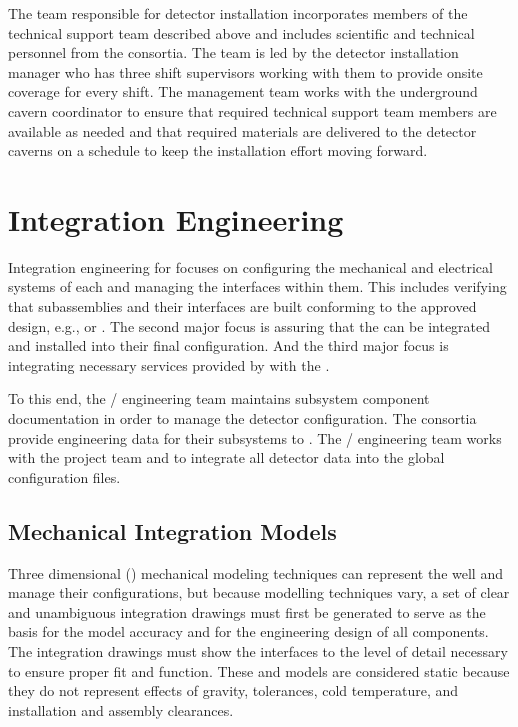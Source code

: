 The team responsible for detector installation incorporates 
members of the technical support team described above 
and includes scientific and technical personnel from 
the  consortia.  The team is led by the detector
installation manager who has three shift supervisors working 
with them to provide onsite coverage for every shift.
The management team works with the underground cavern
coordinator to ensure that required technical support team 
members are available as needed and that required materials 
are delivered to the detector caverns on a schedule to keep
the installation effort moving forward.   

\section{Integration Engineering}
\label{sec:es-coord-integ-sysengr}

Integration engineering for  focuses on configuring the
mechanical and electrical systems of each  and managing
the interfaces within them. This includes verifying that subassemblies
and their interfaces are built conforming to the approved design,
e.g.,  or . The second major focus
is assuring that the  can be integrated and
installed into their final configuration. And the third major focus is
integrating necessary services provided by  
with the .

To this end, the / engineering team maintains
subsystem component documentation in order to manage the detector
configuration. The consortia provide engineering data for their
subsystems to . The / engineering team
works with the  project team and  to integrate
all detector data into the global  configuration files.

\subsection{Mechanical Integration Models}
\label{sec:es-tc-mech}


Three dimensional (\threed) mechanical modeling techniques can represent the  well and manage their configurations, but because  \threed modelling techniques vary, a set
of clear and unambiguous \twod integration drawings must first be generated to serve as
the basis for the \threed model accuracy and for the engineering
design of all components. The \twod integration drawings must show the 
interfaces to the level of detail necessary to ensure proper fit and function.  These \threed and 
\twod models are considered static because they do not represent effects of gravity, tolerances, cold
temperature, and installation and assembly clearances.

